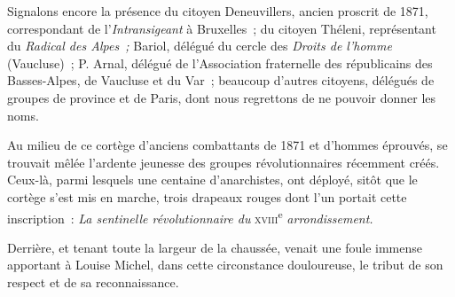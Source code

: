 \documentclass[french,twoside]{book} %
\def\mednobreak{\ifdim\lastskip<\medskipamount
  \removelastskip\nopagebreak\medskip\fi}
\newcommand{\labelblock}[1]{\medbreak{\noindent\color{rubric}\bfseries #1}\par\mednobreak}
\newenvironment{quoteblock}%
  {\begin{quoting}}
  {\end{quoting}}
\newenvironment{quotebar}{%
    \def\FrameCommand{{\color{rubric!10!}\vrule width 0.5em} \hspace{0.9em}}%
    \def\OuterFrameSep{\itemsep} %
    \MakeFramed {\advance\hsize-\width \FrameRestore}
  }%
  {%
    \endMakeFramed
  }
\renewenvironment{quoteblock}%
  {%
    \savenotes
    \setstretch{0.9}
    \normalfont
    \begin{quotebar}
  }
  {%
    \end{quotebar}
    \spewnotes
  }
\begin{document}
\begin{quoteblock}
 Signalons encore la présence du citoyen Deneuvillers, ancien proscrit de 1871, correspondant de l’\emph{Intransigeant} à Bruxelles ; du citoyen Théleni, représentant du \emph{Radical des Alpes ;} Bariol, délégué du cercle des \emph{Droits de l’homme} (Vaucluse) ;  P. Arnal, délégué de l’Association fraternelle des républicains des Basses-Alpes, de Vaucluse et du Var ; beaucoup d’autres citoyens, délégués de groupes de province et de Paris, dont nous regrettons de ne pouvoir donner les noms.\par
 Au milieu de ce cortège d’anciens combattants de 1871 et d’hommes éprouvés, se trouvait mêlée l’ardente jeunesse des groupes révolutionnaires récemment créés. Ceux-là, parmi lesquels une centaine d’anarchistes, ont déployé, sitôt que le cortège s’est mis en marche, trois drapeaux rouges dont l’un portait cette inscription : \emph{La sentinelle révolutionnaire du }{\scshape xviii}\textsuperscript{e} \emph{arrondissement.}\par
 Derrière, et tenant toute la largeur de la chaussée, venait une foule immense apportant à Louise Michel, dans cette circonstance douloureuse, le tribut de son respect et de sa reconnaissance.\par
 
\labelblock{SUR LE PARCOURS}


\end{quoteblock}
\end{document}
